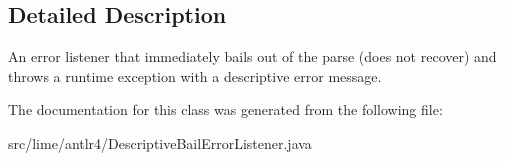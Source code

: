 \subsection{Detailed Description}
An error listener that immediately bails out of the parse (does not recover) and throws a runtime exception with a descriptive error message. 

The documentation for this class was generated from the following file\+:\begin{DoxyCompactItemize}
\item 
src/lime/antlr4/Descriptive\+Bail\+Error\+Listener.\+java\end{DoxyCompactItemize}
